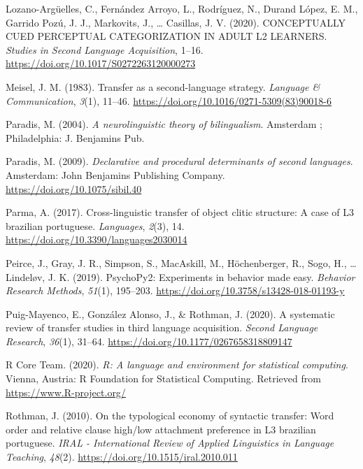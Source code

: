 \documentclass[
  man]{apa6}
\newlength{\cslhangindent}
\newlength{\cslentryspacingunit} %
\newenvironment{CSLReferences}[2] %
 {%
  \setlength{\parindent}{0pt}
  \ifodd #1
  \let\oldpar\par
  \def\par{\hangindent=\cslhangindent\oldpar}
  \fi
  \setlength{\parskip}{#2\cslentryspacingunit}
 }%
 {}
\begin{document}
\begin{CSLReferences}{1}{0}
\leavevmode{}%
Lozano-Argüelles, C., Fernández Arroyo, L., Rodríguez, N., Durand López, E. M., Garrido Pozú, J. J., Markovits, J., \ldots{} Casillas, J. V. (2020). {CONCEPTUALLY} {CUED} {PERCEPTUAL} {CATEGORIZATION} {IN} {ADULT} L2 {LEARNERS}. \emph{Studies in Second Language Acquisition}, 1--16. \url{https://doi.org/10.1017/S0272263120000273}

\leavevmode{}%
Meisel, J. M. (1983). Transfer as a second-language strategy. \emph{Language \& Communication}, \emph{3}(1), 11--46. \url{https://doi.org/10.1016/0271-5309(83)90018-6}

\leavevmode{}%
Paradis, M. (2004). \emph{A neurolinguistic theory of bilingualism}. Amsterdam ; Philadelphia: J. Benjamins Pub.

\leavevmode{}%
Paradis, M. (2009). \emph{Declarative and procedural determinants of second languages}. Amsterdam: John Benjamins Publishing Company. \url{https://doi.org/10.1075/sibil.40}

\leavevmode{}%
Parma, A. (2017). Cross-linguistic transfer of object clitic structure: A case of L3 brazilian portuguese. \emph{Languages}, \emph{2}(3), 14. \url{https://doi.org/10.3390/languages2030014}

\leavevmode{}%
Peirce, J., Gray, J. R., Simpson, S., MacAskill, M., Höchenberger, R., Sogo, H., \ldots{} Lindeløv, J. K. (2019). {PsychoPy}2: Experiments in behavior made easy. \emph{Behavior Research Methods}, \emph{51}(1), 195--203. \url{https://doi.org/10.3758/s13428-018-01193-y}

\leavevmode{}%
Puig-Mayenco, E., González Alonso, J., \& Rothman, J. (2020). A systematic review of transfer studies in third language acquisition. \emph{Second Language Research}, \emph{36}(1), 31--64. \url{https://doi.org/10.1177/0267658318809147}

\leavevmode{}%
R Core Team. (2020). \emph{R: A language and environment for statistical computing}. Vienna, Austria: R Foundation for Statistical Computing. Retrieved from \url{https://www.R-project.org/}

\leavevmode{}%
Rothman, J. (2010). On the typological economy of syntactic transfer: Word order and relative clause high/low attachment preference in L3 brazilian portuguese. \emph{{IRAL} - International Review of Applied Linguistics in Language Teaching}, \emph{48}(2). \url{https://doi.org/10.1515/iral.2010.011}


\end{CSLReferences}
\end{document}

